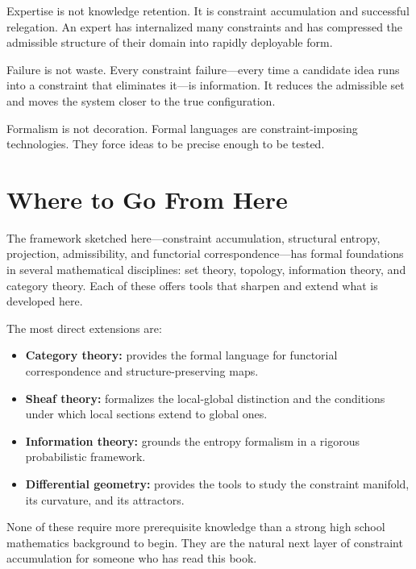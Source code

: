 \documentclass[11pt]{book}
\theoremstyle{plain}
\theoremstyle{definition}
\theoremstyle{remark}
\begin{document}
Expertise is not knowledge retention. It is constraint accumulation and
successful relegation. An expert has internalized many constraints and has
compressed the admissible structure of their domain into rapidly deployable
form.

Failure is not waste. Every constraint failure---every time a candidate
idea runs into a constraint that eliminates it---is information. It reduces
the admissible set and moves the system closer to the true configuration.

Formalism is not decoration. Formal languages are constraint-imposing
technologies. They force ideas to be precise enough to be tested.

\section{Where to Go From Here}

The framework sketched here---constraint accumulation, structural entropy,
projection, admissibility, and functorial correspondence---has formal
foundations in several mathematical disciplines: set theory, topology,
information theory, and category theory. Each of these offers tools that
sharpen and extend what is developed here.

The most direct extensions are:
\begin{itemize}
  \item \textbf{Category theory:} provides the formal language for
        functorial correspondence and structure-preserving maps.
  \item \textbf{Sheaf theory:} formalizes the local-global distinction and
        the conditions under which local sections extend to global ones.
  \item \textbf{Information theory:} grounds the entropy formalism in a
        rigorous probabilistic framework.
  \item \textbf{Differential geometry:} provides the tools to study the
        constraint manifold, its curvature, and its attractors.
\end{itemize}

None of these require more prerequisite knowledge than a strong high school
mathematics background to begin. They are the natural next layer of
constraint accumulation for someone who has read this book.

\end{document}
